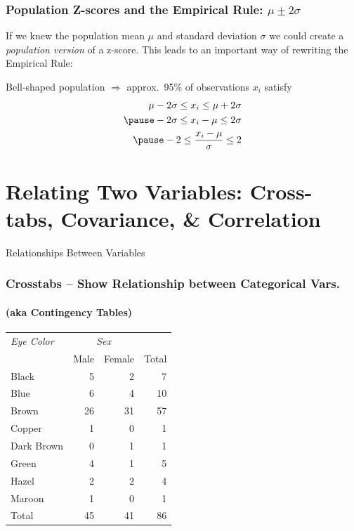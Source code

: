 

\begin{frame}
\frametitle{Population Z-scores and the Empirical Rule: $\mu \pm 2\sigma$}
If we knew the population mean $\mu$ and standard deviation $\sigma$ we could create a \alert{\emph{population version}} of a z-score. This leads to an important way of rewriting the Empirical Rule:

\pause
\vspace{2em}
\alert{Bell-shaped population $\Rightarrow$ approx.\ 95\% of observations $x_i$ satisfy}
\begin{eqnarray*}
\mu - 2\sigma \leq x_i \leq \mu + 2\sigma\\\pause
-2 \sigma \leq x_i -\mu \leq 2\sigma\\\pause
-2 \leq \frac{x_i - \mu}{\sigma} \leq 2
\end{eqnarray*}


\end{frame}
\section{Relating Two Variables: Cross-tabs, Covariance, \& Correlation}
\begin{frame}
\begin{center}
	\Huge Relationships Between Variables
\end{center}

\end{frame}

\begin{frame}
\frametitle{Crosstabs -- Show Relationship between Categorical Vars.}
\framesubtitle{(aka Contingency Tables)}
\begin{table}
\centering
\begin{tabular}{l|rr|r}
	\emph{Eye Color} & \multicolumn{2}{|c|}{\emph{Sex}}\\
	& Male & Female & Total\\
	\hline
	Black&5&2&7\\
	Blue&6&4&10\\
	Brown&26&31&57\\
	Copper&1&0&1\\
	Dark Brown&0&1&1\\
	Green&4&1&5\\
	Hazel&2&2&4\\
	Maroon&1&0&1\\
	\hline
	Total&45&41&86
\end{tabular}
\end{table}
\end{frame}

